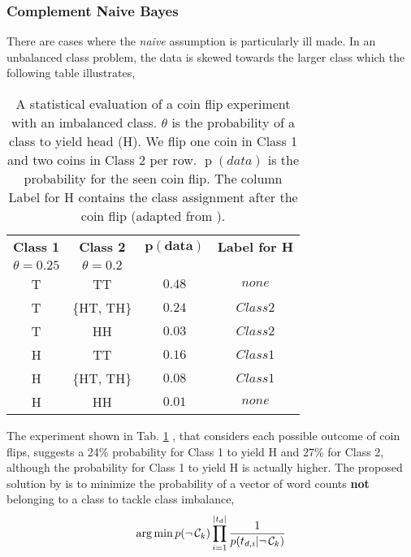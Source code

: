 \subsubsection{Complement Naive Bayes}
  There are cases where the \emph{naive} assumption is particularly ill made. In an unbalanced class problem, the data is skewed towards the larger class which the following table illustrates,

  \begin{table}[h!]
    \centering
    \caption{A statistical evaluation of a coin flip experiment with an imbalanced class. $\theta$ is the probability of a class to yield head (H). We flip one coin in Class 1 and two coins in Class 2 per row. $\operatorname{p}(data)$ is the probability for the seen coin flip. The column Label for H contains the class assignment after the coin flip (adapted from \cite{Rennie2003}).}
    \setlength{\tabcolsep}{1.5em}
    \begin{tabular}{@{}cccc@{}}
      \toprule
      \textbf{Class 1} & \textbf{Class 2} & $\mathbf{p(data)}$ & \textbf{Label for H} \\
      $\theta = 0.25$ & $\theta=0.2$ & & \\
      \midrule
      T & TT & $0.48$ & $none$ \\
      T & \{HT, TH\} & $0.24$ & $Class 2$ \\
      T & HH & $0.03$ & $Class 2$ \\
      H & TT & $0.16$ & $Class 1$ \\
      H & \{HT, TH\} & $0.08$ & $Class 1$ \\
      H & HH & $0.01$ & $none$ \\
      \bottomrule
    \end{tabular}
    \label{table:coinflip}
  \end{table}
  The experiment shown in Tab. \ref{table:coinflip} , that considers each possible outcome of coin flips, suggests a 24\% probability for Class 1 to yield H and 27\% for Class 2, although the probability for Class 1 to yield H is actually higher.
  The proposed solution by \cite{Rennie2003} is to minimize the probability of a vector of word counts \textbf{not} belonging to a class to tackle class imbalance,
  \[\operatorname*{arg\,min} p(\neg\, \mathcal{C}_k) \prod_{i=1}^{|t_{d}|} \frac{1}{p(t_{d,i}|\neg\, \mathcal{C}_k)} \]

